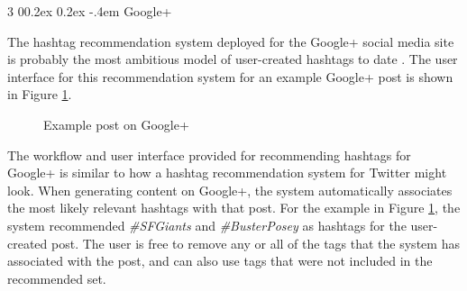 \documentclass[man,floatsintext,donotrepeattitle]{apa6}
\makeatletter
\renewcommand{\subsubsection}{%
  \@startsection
  {subsubsection}%
  {3}%
  {\parindent}%
  {0\baselineskip \@plus 0.2ex \@minus 0.2ex}%
  {-.4em}%
  {\normalfont\normalsize\bfseries\addperi}}
\makeatother
\begin{document}
\subsubsection{Google+}

The hashtag recommendation system deployed for the Google+ social media site is probably the most ambitious model of user-created hashtags to date \parencite{GoogleKeynote2013}.
The user interface for this recommendation system for an example Google+ post is shown in Figure \ref{figGoogle+Hashtags}.

\begin{figure}[!htbp]
  \caption{Example post on Google+}
  \label{figGoogle+Hashtags}
\end{figure}

The workflow and user interface provided for recommending hashtags for Google+ is similar to how a hashtag recommendation system for Twitter might look.
When generating content on Google+, the system automatically associates the most likely relevant hashtags with that post.
For the example in Figure \ref{figGoogle+Hashtags}, the system recommended \emph{\#SFGiants} and \emph{\#BusterPosey} as hashtags for the user-created post.
The user is free to remove any or all of the tags that the system has associated with the post, and can also use tags that were not included in the recommended set.
\end{document}
